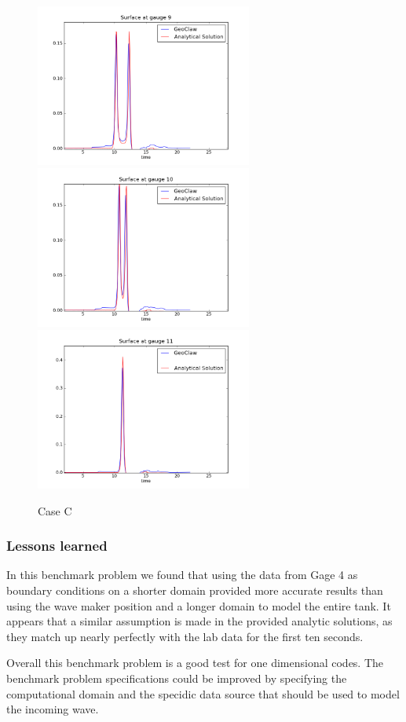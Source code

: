 \begin{figure}[ht]
\hfil\includegraphics[width=2.8in]{bp2/CaseC/gauge0009fig300.png}\hfil
\vskip 5pt
\hfil\includegraphics[width=2.8in]{bp2/CaseC/gauge0010fig300.png}\hfil
\hfil\includegraphics[width=2.8in]{bp2/CaseC/gauge0011fig300.png}\hfil
\caption{\label{fig:bp2C} Case C }
\end{figure}

\subsubsection{Lessons learned}
In this benchmark problem we found that using the data from Gage 4 as boundary conditions on a shorter domain provided more accurate results than using the wave maker position and a longer domain to model the entire tank.  It appears that a similar assumption is made in the provided analytic solutions, as they match up nearly perfectly with the lab data for the first ten seconds.  

Overall this benchmark problem is a good test for one dimensional codes.  The benchmark problem specifications could be improved by specifying the computational domain and the specidic data source that should be used to model the incoming wave. 

